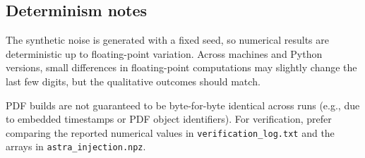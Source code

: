 \subsection{Determinism notes}
The synthetic noise is generated with a fixed seed, so numerical results are deterministic up to floating-point variation. Across machines and Python versions, small differences in floating-point computations may slightly change the last few digits, but the qualitative outcomes should match.

PDF builds are not guaranteed to be byte-for-byte identical across runs (e.g., due to embedded timestamps or PDF object identifiers). For verification, prefer comparing the reported numerical values in \texttt{verification\_log.txt} and the arrays in \texttt{astra\_injection.npz}.
